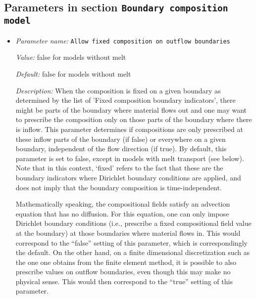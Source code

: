 \subsection{Parameters in section \tt Boundary composition model}
\label{parameters:Boundary_20composition_20model}

\begin{itemize}
\item {\it Parameter name:} {\tt Allow fixed composition on outflow boundaries}
\label{parameters:Boundary composition model/Allow fixed composition on outflow boundaries}
\label{parameters:Boundary_20composition_20model/Allow_20fixed_20composition_20on_20outflow_20boundaries}


{\it Value:} false for models without melt


{\it Default:} false for models without melt


{\it Description:} When the composition is fixed on a given boundary as determined by the list of 'Fixed composition boundary indicators', there might be parts of the boundary where material flows out and one may want to prescribe the composition only on those parts of the boundary where there is inflow. This parameter determines if compositions are only prescribed at these inflow parts of the boundary (if false) or everywhere on a given boundary, independent of the flow direction (if true). By default, this parameter is set to false, except in models with melt transport (see below). Note that in this context, `fixed' refers to the fact that these are the boundary indicators where Dirichlet boundary conditions are applied, and does not imply that the boundary composition is time-independent. 

Mathematically speaking, the compositional fields satisfy an advection equation that has no diffusion. For this equation, one can only impose Dirichlet boundary conditions (i.e., prescribe a fixed compositional field value at the boundary) at those boundaries where material flows in. This would correspond to the ``false'' setting of this parameter, which is correspondingly the default. On the other hand, on a finite dimensional discretization such as the one one obtains from the finite element method, it is possible to also prescribe values on outflow boundaries, even though this may make no physical sense. This would then correspond to the ``true'' setting of this parameter.


\end{itemize}
